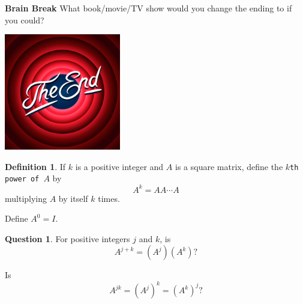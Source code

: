 \documentclass[handout]{beamer}
\newcommand{\fn}{\insertframenumber}
\theoremstyle{definition}
\newtheorem{question}[exercise]{Question}
\newtheorem*{defn}{Definition}
\renewcommand{\emph}[1]{{\color{blue}\texttt{#1}}}
\begin{document}
\begin{frame}{\fn}
	\begin{block}{\textbf{Brain Break}}
		What book/movie/TV show would you change the ending to if you could?
		\begin{center}
		\includegraphics[width=2in]{images/end}
		\end{center}
	\end{block}
\end{frame}
\begin{frame}{\fn}
	\begin{defn}
		If $k$ is a positive integer and $A$ is a square matrix, define the \emph{$k$th power of $A$} by
		\[A^k=AA\cdots A\]
		multiplying $A$ by itself $k$ times.
		
		Define $A^0=I$.
		
	\end{defn}
	\begin{question}
		For positive integers $j$ and $k$, is $$A^{j+k}=(A^j)(A^k)?$$ 
		
		Is $$A^{jk}=(A^j)^k=(A^k)^j?$$
	\end{question}
\end{frame}
\end{document}
